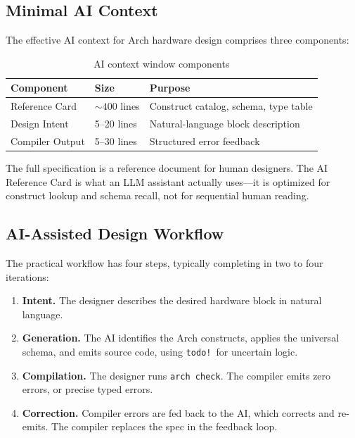 \documentclass[manuscript]{acmart}
\begin{document}
\subsection{Minimal AI Context}

The effective AI context for Arch hardware design comprises three components:

\begin{table}[H]
\centering
\caption{AI context window components}
\label{tab:aicontext}
\small
\begin{tabular}{@{}llp{3.2cm}@{}}
\toprule
\textbf{Component} & \textbf{Size} & \textbf{Purpose} \\
\midrule
Reference Card & ${\sim}400$ lines & Construct catalog, schema, type table \\
Design Intent & 5--20 lines & Natural-language block description \\
Compiler Output & 5--30 lines & Structured error feedback \\
\bottomrule
\end{tabular}
\end{table}

The full specification is a reference document for human designers.
The AI Reference Card is what an LLM assistant actually uses---it is optimized for construct lookup and schema recall, not for sequential human reading.

\subsection{AI-Assisted Design Workflow}

The practical workflow has four steps, typically completing in two to four iterations:

\begin{enumerate}
\item \textbf{Intent.} The designer describes the desired hardware block in natural language.
\item \textbf{Generation.} The AI identifies the Arch constructs, applies the universal schema, and emits source code, using \texttt{todo!}\ for uncertain logic.
\item \textbf{Compilation.} The designer runs \texttt{arch check}. The compiler emits zero errors, or precise typed errors.
\item \textbf{Correction.} Compiler errors are fed back to the AI, which corrects and re-emits. The compiler replaces the spec in the feedback loop.
\end{enumerate}
\end{document}
